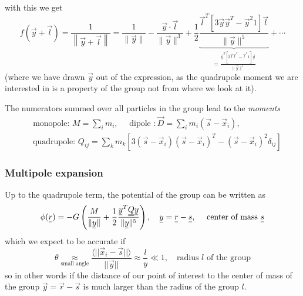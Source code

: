with this we get
\begin{equation}
    f(\vec{y}+\vec{l})=\frac{1}{\left\|\vec{y}+\vec{l}\right\|}=\frac{1}{\|\vec{y}\|}-\frac{\vec{y} \cdot \vec{l}}{\|\vec{y}\|^3}+\frac{1}{2} \underbrace{\frac{\vec{l}^T\left[3 \vec{y} \vec{y}^T-\vec{y}^2 1\right] \vec{l}}{\|\vec{y}\|^5}}_{=\frac{\vec{y}^T\left[3 \vec{l} \vec{l}^T-\vec{l}^2 1\right] \vec{y}}{\|\vec{y}\|^5}}+\cdots
\end{equation}
(where we have drawn $\vec{y}$ out of the expression, as the quadrupole moment we are interested in is a property of the group
not from where we look at it).

The numerators summed over all particles in the group lead to the \textit{moments}
\begin{equation}
    \begin{aligned}
    & \text { monopole: } M=\sum_i m_i, \quad \text { dipole }: \vec{D}=\sum_i m_i\left(\vec{s}-\vec{x}_i\right), \\
    & \text { quadrupole: } Q_{i j}=\sum_k m_k\left[3\left(\vec{s}-\vec{x}_i\right)\left(\vec{s}-\vec{x}_i\right)^T-\left(\vec{s}-\vec{x}_i\right)^2 \delta_{i j}\right]
    \end{aligned}
\end{equation}


\subsubsection{Multipole expansion}
Up to the quadrupole term, the potential of the group can be written as
\begin{equation}
    \phi(\vec{r})=-G\left(\frac{M}{\|\vec{y}\|}+\frac{1}{2} \frac{\vec{y}^{T} \mat{Q} \vec{y}}{\|\vec{y}\|^5}\right), \quad \vec{y}=\vec{r}-\vec{s}, \quad \text { center of mass } \vec{s}
\end{equation}
which we expect to be accurate if
\begin{equation}
    \theta \underset{\text{small angle}}{\approx} \frac{\langle ||\vec{x}_i - \vec{s}|| \rangle}{||\vec{y}||} \approx \frac{l}{y} \ll 1, \quad \text{radius } l \text{ of the group}
\end{equation}
so in other words if the distance
of our point of interest to the center of mass
of the group $\vec{y} = \vec{r} - \vec{s}$ is much 
larger than the radius of the group $l$.

